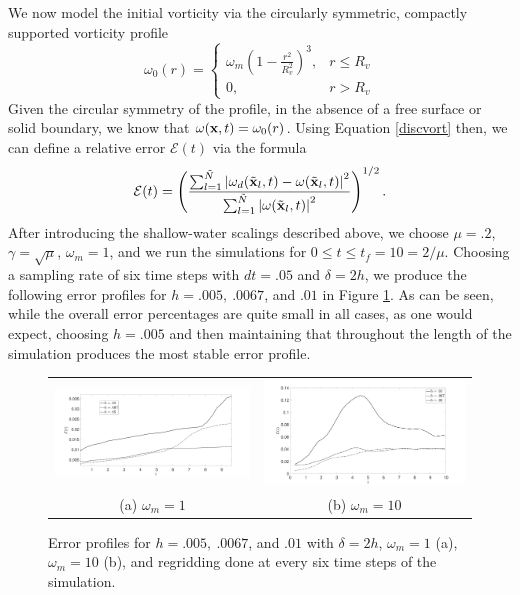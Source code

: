 \documentclass[a4paper,11pt]{article}
\newcommand{\ba}{\begin{array}}
\newcommand{\ea}{\end{array}}
\begin{document}
We now model the initial vorticity via the circularly symmetric, compactly supported vorticity profile
\[
\omega_{0}(r) =\left\{  \ba{rl}  \omega_{m}\left(1-\frac{r^{2}}{R_{v}^{2}}\right)^{3}, & r\leq R_{v} \\ 0, & r>R_{v} \ea\right.
\] 
Given the circular symmetry of the profile, in the absence of a free surface or solid boundary, we know that $\omega({\bf x},t) = \omega_{0}(r)$.  Using Equation \eqref{discvort} then, we can define a relative error $\mathcal{E}(t)$ via the formula 
\[
\mathcal{E}(t) = \left(\frac{\sum_{l=1}^{\tilde{N}}\left|\omega_{d}(\tilde{\bf x}_{l},t) - \omega(\tilde{\bf x}_{l},t) \right|^{2}}{\sum_{l=1}^{\tilde{N}}\left|\omega(\tilde{\bf x}_{l},t) \right|^{2}} \right)^{1/2}.
\]
After introducing the shallow-water scalings described above, we choose $\mu=.2$, $\gamma=\sqrt{\mu}$, $\omega_{m}=1$, and we run the simulations for $0\leq t \leq t_{f}=10 = 2/\mu$.  Choosing a sampling rate of six time steps with $dt=.05$ and $\delta = 2h$, we produce the following error profiles for $h=.005, ~ .0067$, and $.01$ in Figure \ref{fig:err_prof}.  As can be seen, while the overall error percentages are quite small in all cases, as one would expect, choosing $h=.005$ and then maintaining that throughout the length of the simulation produces the most stable error profile.  
\begin{figure}[!h]
\centering
\begin{tabular}{cc}
\includegraphics[width=.4\textwidth]{full_error_comparison} & \includegraphics[width=.4\textwidth]{full_error_comparison_wm_10}\\
(a) $\omega_{m}=1$ & (b) $\omega_{m}=10$
\end{tabular}
\caption{Error profiles for $h=.005, ~ .0067$, and $.01$ with $\delta=2h$, $\omega_{m}=1$ (a), $\omega_{m}=10$ (b), and regridding done at every six time steps of the simulation.}
\label{fig:err_prof}
\end{figure}
\end{document}
